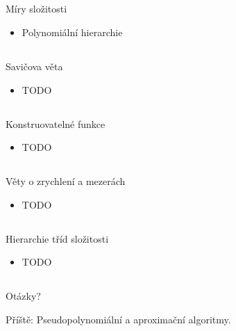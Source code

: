 \documentclass{beamer}
\begin{document}
\subsection{}
\begin{frame}{Míry složitosti}
\begin{itemize}
\item Polynomiální hierarchie
\end{itemize}
\end{frame}

\subsection{}
\begin{frame}{Savičova věta}
\begin{itemize}
\item TODO
\end{itemize}
\end{frame}

\subsection{}
\begin{frame}{Konstruovatelné funkce}
\begin{itemize}
\item TODO
\end{itemize}
\end{frame}

\subsection{}
\begin{frame}{Věty o zrychlení a mezerách}
\begin{itemize}
\item TODO
\end{itemize}
\end{frame}

\subsection{}
\begin{frame}{Hierarchie tříd složitosti}
\begin{itemize}
\item TODO
\end{itemize}
\end{frame}

\subsection{}
\begin{frame}{Otázky?}
\begin{center}
Příště: Pseudopolynomiální a aproximační algoritmy.
\end{center}
\end{frame}
\end{document}
